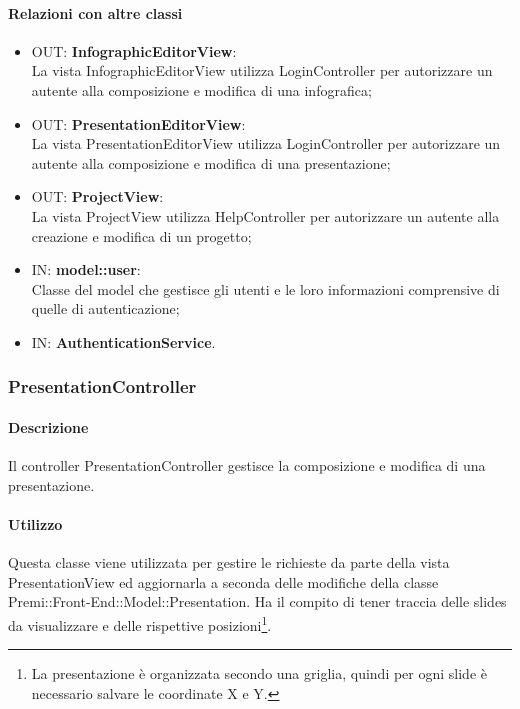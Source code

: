 	\paragraph{Relazioni con altre classi}
	\begin{itemize}
	  \item OUT: \textbf{InfographicEditorView}:\\
		La vista InfographicEditorView utilizza LoginController per autorizzare un autente alla composizione e modifica di una infografica;	
	  \item OUT: \textbf{PresentationEditorView}:\\
		La vista PresentationEditorView utilizza LoginController per autorizzare un autente alla composizione e modifica di una presentazione;	
	  \item OUT: \textbf{ProjectView}:\\
		La vista ProjectView utilizza HelpController per autorizzare un autente alla creazione e modifica di un progetto;	
	  \item IN: \textbf{model::user}:\\
		Classe del model che gestisce gli utenti e le loro informazioni comprensive di quelle di autenticazione;
	   \item IN: \textbf{AuthenticationService}.
	\end{itemize}
\subsubsection{PresentationController}
	\paragraph{Descrizione}
	Il controller PresentationController gestisce la composizione e modifica di una presentazione.
	
	\paragraph{Utilizzo}
	Questa classe viene utilizzata per gestire le richieste da parte della vista PresentationView ed aggiornarla a seconda delle modifiche della classe Premi::Front-End::Model::Presentation.
	Ha il compito di tener traccia delle slides da visualizzare e delle rispettive posizioni\footnote{La presentazione è organizzata secondo una griglia, quindi per ogni slide è necessario salvare le coordinate X e Y.}.
